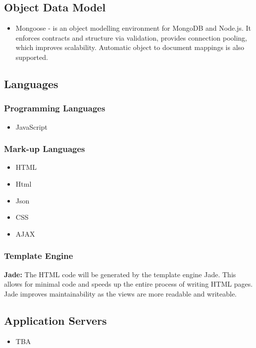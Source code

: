 \subsection{Object Data Model}
\begin{itemize}
	\item Mongoose - is an object modelling environment for MongoDB and Node.js. It enforces contracts and structure via validation, provides connection pooling, which improves scalability. Automatic object to document mappings is also supported.
\end{itemize}

\subsection{Languages}
\subsubsection{Programming Languages}
\begin{itemize}
	\item JavaScript	
\end{itemize}

\subsubsection{Mark-up Languages}
\begin{itemize}
	\item HTML
	\item Html
	\item Json
	\item CSS
	\item AJAX
\end{itemize}

\subsubsection{Template Engine}
\textbf{Jade:} The HTML code will be generated by the template engine Jade. This allows for minimal code and speeds up the entire process of writing HTML pages. Jade improves maintainability as the views are more readable and writeable.


\subsection{Application Servers}
\begin{itemize}
	\item TBA
\end{itemize}

